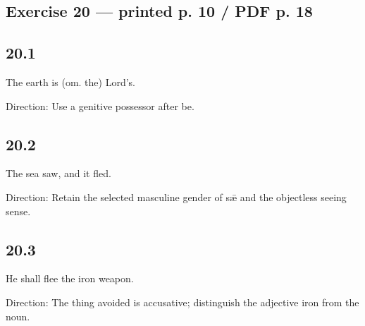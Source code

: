 \subsection*{Exercise 20 — printed p. 10 /\allowbreak{} PDF p. 18}

\subsection*{20.1}

\par\begin{minipage}{\linewidth}\raggedright
The earth is (om. the) Lord’s.

Direction: Use a genitive possessor after be.

\end{minipage}\par\addvspace{4pt}

\subsection*{20.2}

\par\begin{minipage}{\linewidth}\raggedright
The sea saw, and it fled.

Direction: Retain the selected masculine gender of sǣ and the objectless seeing sense.

\end{minipage}\par\addvspace{4pt}

\subsection*{20.3}

\par\begin{minipage}{\linewidth}\raggedright
He shall flee the iron weapon.

Direction: The thing avoided is accusative; distinguish the adjective iron from the noun.

\end{minipage}\par\addvspace{4pt}

